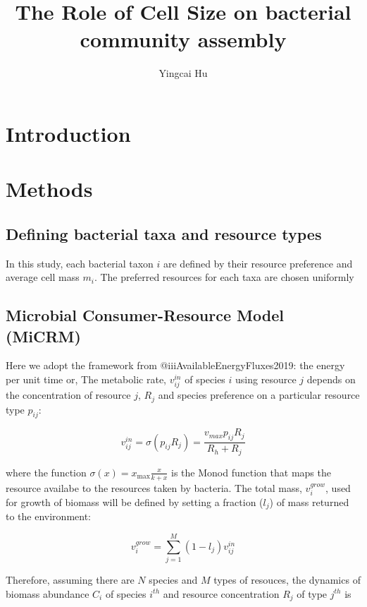 \documentclass[12pt]{article}
\title{The Role of Cell Size on bacterial community assembly}
\author{Yingcai Hu}
\begin{document}
\maketitle

\section{Introduction}



\section{Methods}

\subsection{Defining bacterial taxa and resource types}

In this study, each bacterial taxon $i$ are defined by their resource preference and average cell mass $m_i$. The preferred resources for each taxa are chosen uniformly

\subsection{Microbial Consumer-Resource Model (MiCRM)}

Here we adopt the framework from @iiiAvailableEnergyFluxes2019: the energy per unit time or, The metabolic rate, $v^{in}_{ij}$ of species $i$ using resource $j$ depends on the concentration of resource $j$, $R_j$ and species preference on a particular resource type $p_{ij}$:

\begin{equation}
    v^{in}_{ij} =  \sigma(p_{ij} R_j) = \frac{v_{max}p_{ij}R_{j}}{R_h + R_{j}}
\end{equation}


where the function $\sigma(x) = x_{\max} \frac{x}{k + x}$ is the Monod function that maps the resource availabe to the resources taken by bacteria. The total mass, $ v^{grow}_i $, used for growth of biomass will be defined by setting a fraction ($l_{j}$) of mass returned to the environment:

\begin{equation}
    v^{grow}_{i} = \sum^M_{j=1} (1-l_{j}) v^{in}_{ij}
\end{equation}

Therefore, assuming there are $N$ species and $M$ types of resouces,
the dynamics of biomass abundance $C_i$ of species $i^{th}$ and resource concentration $R_j$ of type $j^{th}$  is
\end{document}

